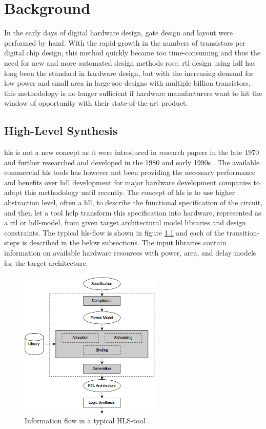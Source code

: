 \chapter{\label{chp:background}Background}
In the early days of digital hardware design, gate design and layout were performed by hand. With the rapid growth in the numbers of transistors per digital chip design, this method quickly became too time-consuming and thus the need for new and more automated design methods rose. \gls{rtl} design using \gls{hdl} has long been the standard in hardware design, but with the increasing demand for low power and small area in large \gls{soc} designs with multiple billion transistors, this methodology is no longer sufficient if hardware manufacturers want to hit the window of opportunity with their state-of-the-art product.

\section{\label{sec:hls}High-Level Synthesis}

\gls{hls} is not a new concept as it were introduced in research papers in the late 1970 and further researched and developed in the 1980 and early 1990s \cite{martin2009high}. The available commercial \gls{hls} tools has however not been providing the necessary performance and benefits over \gls{hdl} development for major hardware development companies to adapt this methodology until recently.
The concept of \gls{hls} is to use higher abstraction level, often a \gls{hll}, to describe the functional specification of the circuit, and then let a tool help transform this specification into hardware, represented as a \gls{rtl} or \gls{hdl}-model, from given target architectural model libraries and design constraints. The typical \gls{hls}-flow is shown in figure \ref{fig:hlsflow} and each of the transition-steps is described in the below subsections. The input libraries contain information on available hardware resources with power, area, and delay models for the target architecture.

\begin{figure}[hbpt]
\centering
\includegraphics[width=0.6\textwidth]{../figs/HLSFlow.png}
\caption{\label{fig:hlsflow}Information flow in a typical HLS-tool \cite{coussy2009introduction}.}
\end{figure}

